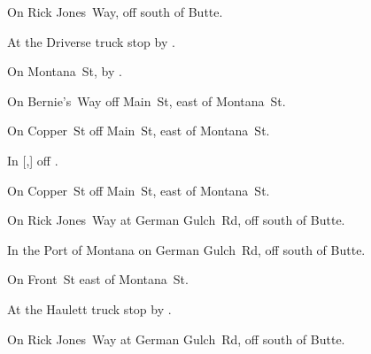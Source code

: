 

\begin{LocationList}

On Rick Jones~Way, off   south of Butte.

At the Driverse truck stop by   .

On Montana~St, by   .

On Bernie's~Way off Main~St, east of Montana~St.

On Copper~St off Main~St, east of Montana~St.

In [,] off  .

On Copper~St off Main~St, east of Montana~St.

On Rick Jones~Way at German Gulch~Rd, off   south of Butte.

In the Port of Montana on German Gulch~Rd, off   south of Butte.

On Front~St east of Montana~St.

\Location{\TruckService \Service \Gas \Rest}
At the Haulett truck stop by   .

On Rick Jones~Way at German Gulch~Rd, off   south of Butte.

\end{LocationList}
